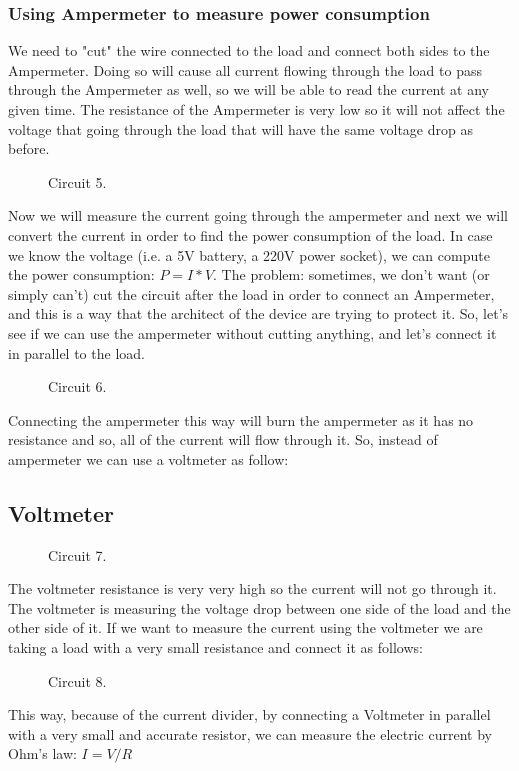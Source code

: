 \subsubsection{Using Ampermeter to measure power consumption}
We need to "cut" the wire connected to the load and connect both sides to the Ampermeter.
Doing so will cause all current flowing through the load to pass through the Ampermeter as well, so we will be able to read the current at any given time. The resistance of the Ampermeter is very low so it will not affect the voltage that going through the load that will have the same voltage drop as before. 
\begin{figure}
    \centering
    
    \caption{Circuit 5.} \label{fig:circuit5}
\end{figure}
Now we will measure the current going through the ampermeter and next we will convert the current in order to find the power consumption of the load.
In case we know the voltage (i.e. a 5V battery, a 220V power socket), we can compute the power consumption: $P=I*V$.
The problem: sometimes, we don't want (or simply can't) cut the circuit after the load in order to connect an Ampermeter, and this is a way that the architect of the device are trying to protect it. So, let’s see if we can use the ampermeter without cutting anything, and let’s connect it in parallel to the load.
\begin{figure}
    \centering
    
    \caption{Circuit 6.} \label{fig:circuit6}
\end{figure}
Connecting the ampermeter this way will burn the ampermeter as it has no resistance and so, all of the current will flow through it. So, instead of ampermeter we can use a voltmeter as follow:
\subsection{Voltmeter}
\begin{figure}
    \centering
    
    \caption{Circuit 7.} \label{fig:circuit7}
\end{figure}
The voltmeter resistance is very very high so the current will not go through it. The voltmeter is measuring the voltage drop between one side of the load and the other side of it. If we want to measure the current using the voltmeter we are taking a load with a very small resistance and connect it as follows:
\begin{figure}
    \centering
    
    \caption{Circuit 8.} \label{fig:circuit8}
\end{figure}
This way, because of the current divider, by connecting a Voltmeter in parallel with a very small and accurate resistor, we can measure the electric current by Ohm's law: $I=V/R$
 
